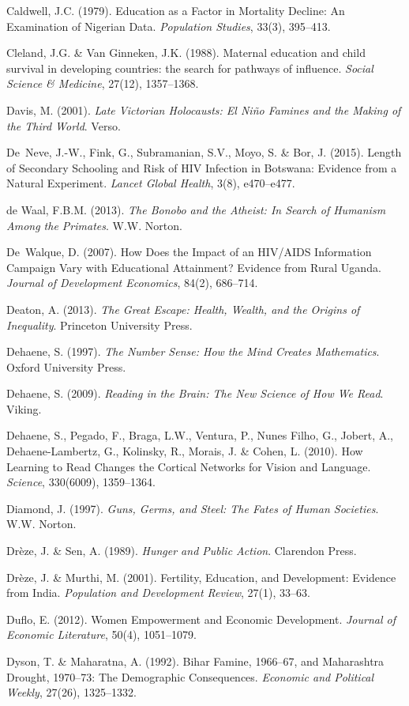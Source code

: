 Caldwell, J.C. (1979). Education as a Factor in Mortality Decline:
An Examination of Nigerian Data. \emph{Population Studies}, 33(3),
395--413.

Cleland, J.G. \& Van Ginneken, J.K. (1988). Maternal education and
child survival in developing countries: the search for pathways of
influence. \emph{Social Science \& Medicine}, 27(12), 1357--1368.

Davis, M. (2001). \emph{Late Victorian Holocausts: El Niño Famines and
the Making of the Third World}. Verso.

De~Neve, J.-W., Fink, G., Subramanian, S.V., Moyo, S. \& Bor, J.
(2015). Length of Secondary Schooling and Risk of HIV Infection in
Botswana: Evidence from a Natural Experiment. \emph{Lancet Global
Health}, 3(8), e470--e477.

de Waal, F.B.M. (2013). \emph{The Bonobo and the Atheist: In Search
of Humanism Among the Primates}. W.W. Norton.

De~Walque, D. (2007). How Does the Impact of an HIV/AIDS Information
Campaign Vary with Educational Attainment? Evidence from Rural Uganda.
\emph{Journal of Development Economics}, 84(2), 686--714.

Deaton, A. (2013). \emph{The Great Escape: Health, Wealth, and the
Origins of Inequality}. Princeton University Press.

Dehaene, S. (1997). \emph{The Number Sense: How the Mind Creates
Mathematics}. Oxford University Press.

Dehaene, S. (2009). \emph{Reading in the Brain: The New Science of
How We Read}. Viking.

Dehaene, S., Pegado, F., Braga, L.W., Ventura, P., Nunes Filho, G.,
Jobert, A., Dehaene-Lambertz, G., Kolinsky, R., Morais, J. \& Cohen, L.
(2010). How Learning to Read Changes the Cortical Networks for Vision and
Language. \emph{Science}, 330(6009), 1359--1364.

Diamond, J. (1997). \emph{Guns, Germs, and Steel: The Fates of Human
Societies}. W.W. Norton.

Drèze, J. \& Sen, A. (1989). \emph{Hunger and Public Action}. Clarendon
Press.

Drèze, J. \& Murthi, M. (2001). Fertility, Education, and Development:
Evidence from India. \emph{Population and Development Review}, 27(1),
33--63.

Duflo, E. (2012). Women Empowerment and Economic Development.
\emph{Journal of Economic Literature}, 50(4), 1051--1079.

Dyson, T. \& Maharatna, A. (1992). Bihar Famine, 1966--67, and
Maharashtra Drought, 1970--73: The Demographic Consequences.
\emph{Economic and Political Weekly}, 27(26), 1325--1332.

